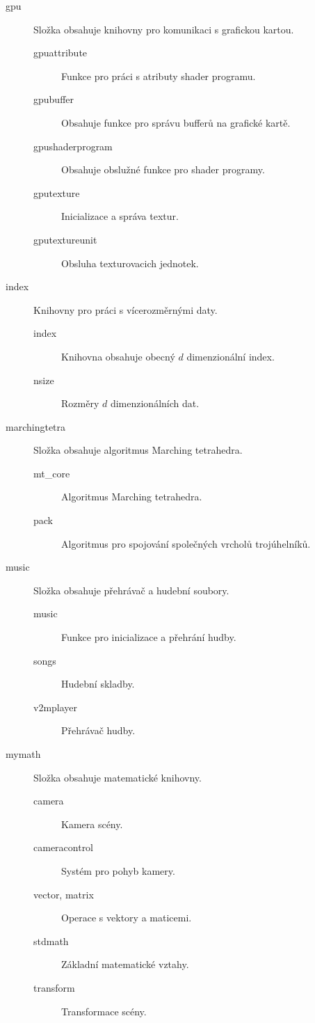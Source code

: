 \begin{description}
\item[gpu] Složka obsahuje knihovny pro komunikaci s grafickou kartou.
\begin{description}
\item[gpuattribute] Funkce pro práci s atributy shader programu.
\item[gpubuffer] Obsahuje funkce pro správu bufferů na grafické kartě.
\item[gpushaderprogram] Obsahuje obslužné funkce pro shader programy.
\item[gputexture] Inicializace a správa textur.
\item[gputextureunit] Obsluha texturovacich jednotek.
\end{description}

\item[index] Knihovny pro práci s vícerozměrnými daty.
\begin{description}
\item[index] Knihovna obsahuje obecný $d$ dimenzionální index.
\item[nsize] Rozměry $d$ dimenzionálních dat.
\end{description}

\item[marchingtetra] Složka obsahuje algoritmus Marching tetrahedra.
\begin{description}
\item[mt\_core] Algoritmus Marching tetrahedra.
\item[pack] Algoritmus pro spojování společných vrcholů trojúhelníků.
\end{description}

\item[music] Složka obsahuje přehrávač a hudební soubory.
\begin{description}
\item[music] Funkce pro inicializace a přehrání hudby.
\item[songs] Hudební skladby.
\item[v2mplayer] Přehrávač hudby.
\end{description}

\item[mymath] Složka obsahuje matematické knihovny.
\begin{description}
\item[camera] Kamera scény.
\item[cameracontrol] Systém pro pohyb kamery.
\item[vector, matrix] Operace s vektory a maticemi.
\item[stdmath] Základní matematické vztahy.
\item[transform] Transformace scény.
\end{description}


\end{description}
